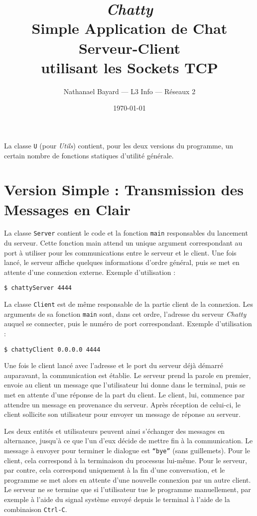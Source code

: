 \documentclass[a4paper,12pt]{article}
\author{Nathanael Bayard --- L3 Info --- Réseaux 2}
\title{\emph{Chatty} \\ Simple Application de Chat Serveur-Client \\ utilisant les Sockets TCP}
\date{\today}
\newcommand{\nopagenum}{\thispagestyle{empty}}
\newcommand{\code}[1]{\texttt{#1}}
\begin{document}
 \maketitle \nopagenum

    La classe \code{U} (pour \emph{Utils}) contient, pour les deux versions du programme, un certain nombre de fonctions statiques d'utilité générale.
    
    \section{Version Simple : Transmission des Messages en Clair}
    
    La classe \code{Server} contient le code et la fonction \code{main} responsables du lancement du serveur. Cette fonction main attend un unique argument correspondant au port à utiliser pour les communications entre le serveur et le client. Une fois lancé, le serveur affiche quelques informations d'ordre général, puis se met en attente d'une connexion externe. Exemple d'utilisation :
    
    \code{\$ chattyServer 4444}
    
    La classe \code{Client} est de même responsable de la partie client de la connexion. Les arguments de sa fonction \code{main} sont, dans cet ordre, l'adresse du serveur \emph{Chatty} auquel se connecter, puis le numéro de port correspondant. Exemple d'utilisation :
    
    \code{\$ chattyClient 0.0.0.0 4444}
    
    Une fois le client lancé avec l'adresse et le port du serveur déjà démarré auparavant, la communication est établie. Le serveur prend la parole en premier, envoie au client un message que l'utilisateur lui donne dans le terminal, puis se met en attente d'une réponse de la part du client. Le client, lui, commence par attendre un message en provenance du serveur. Après réception de celui-ci, le client sollicite son utilisateur pour envoyer un message de réponse au serveur.
    
    Les deux entités et utilisateurs peuvent ainsi s'échanger des messages en alternance, jusqu'à ce que l'un d'eux décide de mettre fin à la communication. Le message à envoyer pour terminer le dialogue est \code{``bye''} (sans guillemets). Pour le client, cela correspond à la terminaison du processus lui-même. Pour le serveur, par contre, cela correspond uniquement à la fin d'une conversation, et le programme se met alors en attente d'une nouvelle connexion par un autre client. Le serveur ne se termine que si l'utilisateur tue le programme manuellement, par exemple à l'aide du signal système envoyé depuis le terminal à l'aide de la combinaison \code{Ctrl-C}.
    
\end{document}
